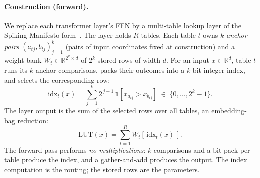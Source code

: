 \documentclass[11pt]{article}
\begin{document}
\paragraph{Construction (forward).} We replace each transformer layer's FFN by a multi-table
lookup layer of the Spiking-Manifesto form~\cite{manifesto}. The layer holds $R$ tables.
Each table $t$ owns $k$ \emph{anchor pairs} $(a_{tj},b_{tj})_{j=1}^{k}$ (pairs of input
coordinates fixed at construction) and a weight bank $W_t\in\mathbb{R}^{2^{k}\times d}$ of
$2^{k}$ stored rows of width $d$. For an input $x\in\mathbb{R}^{d}$, table $t$ runs its $k$
anchor comparisons, packs their outcomes into a $k$-bit integer index, and selects the
corresponding row:
\begin{equation}
\mathrm{idx}_t(x)=\sum_{j=1}^{k} 2^{\,j-1}\,\mathbf{1}\!\left[x_{a_{tj}}>x_{b_{tj}}\right]
\;\in\;\{0,\dots,2^{k}-1\}.
\end{equation}
The layer output is the sum of the selected rows over all tables, an embedding-bag
reduction:
\begin{equation}
\mathrm{LUT}(x)=\sum_{t=1}^{R} W_t\!\left[\,\mathrm{idx}_t(x)\,\right].
\end{equation}
The forward pass performs \emph{no multiplications}: $k$ comparisons and a bit-pack per table
produce the index, and a gather-and-add produces the output. The index computation is the
routing; the stored rows are the parameters.
\end{document}
